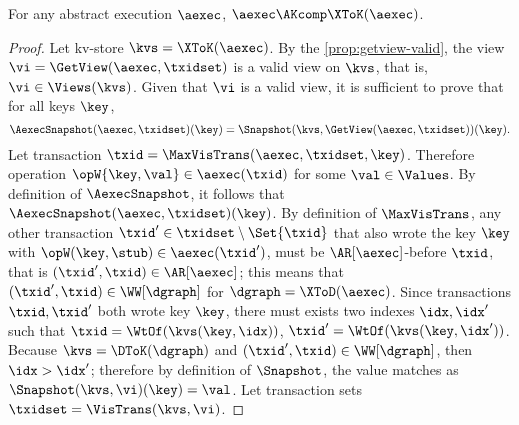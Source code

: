 \begin{toappendix}
\label{sec:proof-xtod-compatibility}
\end{toappendix}
\begin{theoremrep}
\label{thm:xtod-compatibility}
For any abstract execution \(\aexec\), \(\aexec \AKcomp \XToK(\aexec)\).
\end{theoremrep}
\begin{proof}
Let kv-store \( \kvs = \XToK(\aexec) \).
    By the \cref{prop:getview-valid}, the view \( \vi = \GetView(\aexec, \txidset)\) 
    is a valid view on \( \kvs \), that is, \( \vi \in \Views(\kvs) \).
    Given that \( \vi \) is a valid view,
    it is sufficient to prove that for all keys \( \key \),
    \[
        \AexecSnapshot(\aexec,\txidset)(\key) = \Snapshot(\kvs,\GetView(\aexec,\txidset))(\key) .
    \]
    Let transaction \( \txid = \MaxVisTrans(\aexec,\txidset,\key)\).
    Therefore operation \( \opW{\key,\val} \in \aexec(\txid)\) for some \(\val \in \Values \).
    By definition of \(\AexecSnapshot\), it follows that \( \AexecSnapshot(\aexec,\txidset)(\key) \).
    By definition of \( \MaxVisTrans \), any other transaction \( \txid' \in \txidset \setminus \Set{\txid} \) 
    that also wrote the key \( \key \) with \( \opW(\key,\stub) \in \aexec(\txid') \),
    must be \( \AR[\aexec] \)-before \( \txid \), that is \( (\txid',\txid) \in \AR[\aexec] \);
    this means that \( (\txid',\txid) \in \WW[\dgraph] \) for \( \dgraph = \XToD(\aexec) \).
    Since transactions \( \txid, \txid' \) both wrote key \( \key \),
    there must exists two indexes \( \idx, \idx' \) such that \( \txid = \WtOf(\kvs(\key,\idx)) \),
    \( \txid' = \WtOf(\kvs(\key,\idx'))\).
    Because \( \kvs = \DToK(\dgraph)\) and \( (\txid',\txid) \in \WW[\dgraph] \),
    then \( \idx > \idx' \);
    therefore by definition of \( \Snapshot \), the value matches as \( \Snapshot(\kvs,\vi)(\key) = \val \).
    Let transaction sets \( \txidset = \VisTrans(\kvs,\vi) \).

\end{proof}
